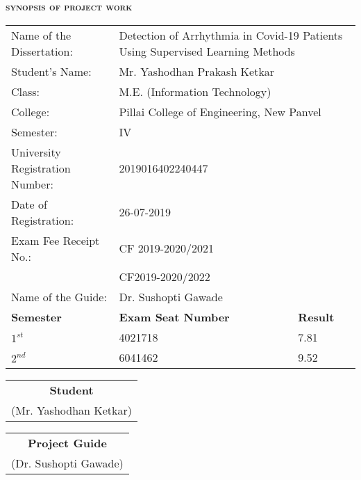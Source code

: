 \thispagestyle{empty}    
{\centering\LARGE\bf
    {\scshape synopsis of project work}\\
}

\vspace{1cm}

{\centering
    \def\arraystretch{1.5}
    \begin{tabular}{p{13em}p{15em}p{6em}}
    Name of the Dissertation: & \multicolumn{2}{p{22em}}{Detection of Arrhythmia in Covid-19 Patients Using Supervised Learning Methods} \\
    Student's Name: & Mr. Yashodhan Prakash Ketkar & \\
    Class: & M.E. (Information Technology) & \\
    College: & \multicolumn{2}{p{22em}}{Pillai College of Engineering, New Panvel}\\
    Semester: & IV & \\
    University Registration Number: & 2019016402240447 \\
    Date of Registration: & 26-07-2019 & \\
    Exam Fee Receipt No.: & CF 2019-2020/2021 & \\
    & CF2019-2020/2022 & \\
    Name of the Guide: & Dr. Sushopti Gawade & \\
    \textbf{Semester} & \textbf{Exam Seat Number} & \textbf{Result} \\
    $1^{st}$ & 4021718 & 7.81 \\
    $2^{nd}$ & 6041462 & 9.52 \\
    \end{tabular}
}

\vspace{4cm}

{\centering
    \begin{tabular}{c}
        \hline 
        \textbf{Student} \\
        (Mr. Yashodhan Ketkar) \\
    \end{tabular}
    \hfill
    \begin{tabular}{c}
        \hline 
        \textbf{Project Guide} \\
        (Dr. Sushopti Gawade) \\ 
    \end{tabular}
}

